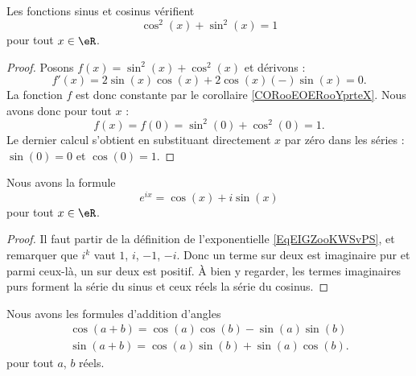 \begin{lemma}       \label{LEMooAEFPooGSgOkF}
    Les fonctions sinus et cosinus vérifient
    \begin{equation}
        \cos^2(x)+\sin^2(x)=1
    \end{equation}
    pour tout \( x\in \eR\).
\end{lemma}

\begin{proof}
    Posons \( f(x)=\sin^2(x)+\cos^2(x)\) et dérivons :
    \begin{equation}
        f'(x)=2\sin(x)\cos(x)+2\cos(x)(-)\sin(x)=0.
    \end{equation}
    La fonction \( f\) est donc constante par le corollaire \ref{CORooEOERooYprteX}. Nous avons donc pour tout \( x\) :
    \begin{equation}
        f(x)=f(0)=\sin^2(0)+\cos^2(0)=1.
    \end{equation}
    Le dernier calcul s'obtient en substituant directement \( x\) par zéro dans les séries : \( \sin(0)=0\) et \( \cos(0)=1\).
\end{proof}

\begin{lemma}
    Nous avons la formule
    \begin{equation}        \label{EQooRVPJooTMwNTU}
        e^{ix}=\cos(x)+i\sin(x)
    \end{equation}
    pour tout \( x\in \eR\).
\end{lemma}

\begin{proof}
    Il faut partir de la définition de l'exponentielle \eqref{EqEIGZooKWSvPS}, et remarquer que \( i^k\) vaut \( 1\), \( i\), \( -1\), \( -i\). Donc un terme sur deux est imaginaire pur et parmi ceux-là, un sur deux est positif. À bien y regarder, les termes imaginaires purs forment la série du sinus et ceux réels la série du cosinus.
\end{proof}

\begin{lemma}
    Nous avons les formules d'addition d'angles
    \begin{subequations}        \label{SUBEQSooFSSMooHcYwRc}
        \begin{align}
            \cos(a+b)=\cos(a)\cos(b)-\sin(a)\sin(b)\\
            \sin(a+b)=\cos(a)\sin(b)+\sin(a)\cos(b).
        \end{align}
    \end{subequations}
    pour tout \( a\), \( b\) réels.
\end{lemma}

